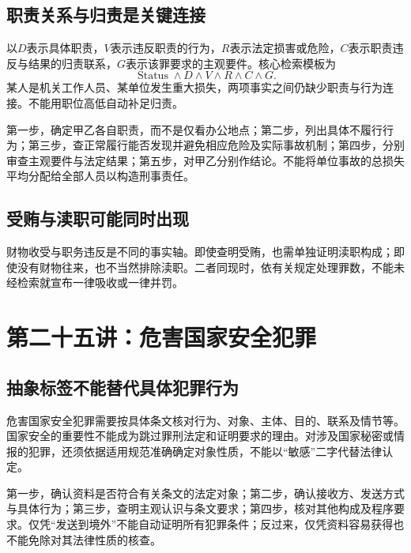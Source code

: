 \subsection{职责关系与归责是关键连接}
以$D$表示具体职责，$V$表示违反职责的行为，$R$表示法定损害或危险，$C$表示职责违反与结果的归责联系，$G$表示该罪要求的主观要件。核心检索模板为
\[
 \operatorname{Status}\wedge D\wedge V\wedge R\wedge C\wedge G.
\]
某人是机关工作人员、某单位发生重大损失，两项事实之间仍缺少职责与行为连接。不能用职位高低自动补足归责。


第一步，确定甲乙各自职责，而不是仅看办公地点；第二步，列出具体不履行行为；第三步，查正常履行能否发现并避免相应危险及实际事故机制；第四步，分别审查主观要件与法定结果；第五步，对甲乙分别作结论。不能将单位事故的总损失平均分配给全部人员以构造刑事责任。

\subsection{受贿与渎职可能同时出现}
财物收受与职务违反是不同的事实轴。即使查明受贿，也需单独证明渎职构成；即使没有财物往来，也不当然排除渎职。二者同现时，依有关规定处理罪数，不能未经检索就宣布一律吸收或一律并罚。


\section{第二十五讲：危害国家安全犯罪}
\subsection{抽象标签不能替代具体犯罪行为}
危害国家安全犯罪需要按具体条文核对行为、对象、主体、目的、联系及情节等。国家安全的重要性不能成为跳过罪刑法定和证明要求的理由。对涉及国家秘密或情报的犯罪，还须依据适用规范准确确定对象性质，不能以“敏感”二字代替法律认定。

第一步，确认资料是否符合有关条文的法定对象；第二步，确认接收方、发送方式与具体行为；第三步，查明主观认识与条文要求；第四步，核对其他构成及程序要求。仅凭“发送到境外”不能自动证明所有犯罪条件；反过来，仅凭资料容易获得也不能免除对其法律性质的核查。

